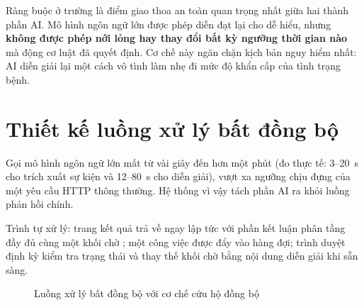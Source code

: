 \begin{luuy}
Ràng buộc ở trường  là điểm giao thoa an toàn quan
trọng nhất giữa hai thành phần AI. Mô hình ngôn ngữ lớn được phép diễn đạt
lại cho dễ hiểu, nhưng \textbf{không được phép nới lỏng hay thay đổi bất kỳ
ngưỡng thời gian nào} mà động cơ luật đã quyết định. Cơ chế này ngăn chặn
kịch bản nguy hiểm nhất: AI diễn giải lại một cách vô tình làm nhẹ đi mức độ
khẩn cấp của tình trạng bệnh.
\end{luuy}

\section{Thiết kế luồng xử lý bất đồng bộ}

Gọi mô hình ngôn ngữ lớn mất từ vài giây đến hơn một phút (đo thực tế:
3--20~s cho trích xuất sự kiện và 12--80~s cho diễn giải), vượt xa ngưỡng chịu
đựng của một yêu cầu HTTP thông thường. Hệ thống vì vậy tách phần AI ra khỏi
luồng phản hồi chính.

Trình tự xử lý: trang kết quả trả về ngay lập tức với phần kết luận phân tầng
đầy đủ cùng một khối chờ ; một công việc  được đẩy
vào hàng đợi; trình duyệt định kỳ kiểm tra trạng thái và thay thế khối chờ bằng
nội dung diễn giải khi sẵn sàng.

\begin{figure}[H]
\centering
{}
\caption{Luồng xử lý bất đồng bộ với cơ chế cứu hộ đồng bộ}
\label{fig:async}
\end{figure}

